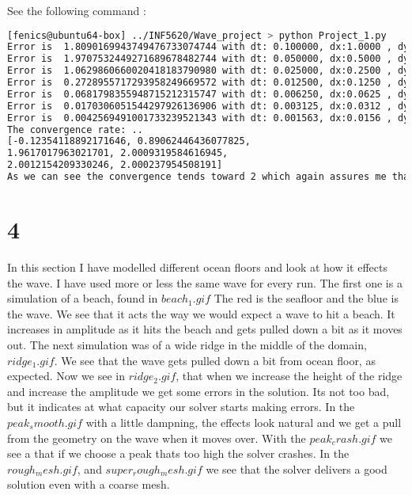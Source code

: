 \documentclass[a4paper,norsk]{article}
\begin{document}
\noindent See the following command :
\begin{lstlisting}[language=bash]
[fenics@ubuntu64-box] ../INF5620/Wave_project > python Project_1.py 
Error is  1.8090169943749476733074744 with dt: 0.100000, dx:1.0000 , dy:1.0000 
Error is  1.9707532449271689678482744 with dt: 0.050000, dx:0.5000 , dy:0.5000 
Error is  1.0629860660020418183790980 with dt: 0.025000, dx:0.2500 , dy:0.2500 
Error is  0.2728955717293958249669572 with dt: 0.012500, dx:0.1250 , dy:0.1250 
Error is  0.0681798355948715212315747 with dt: 0.006250, dx:0.0625 , dy:0.0625 
Error is  0.0170306051544297926136906 with dt: 0.003125, dx:0.0312 , dy:0.0312
Error is  0.0042569491001733239521343 with dt: 0.001563, dx:0.0156 , dy:0.0156 
The convergence rate: .. 
[-0.12354118892171646, 0.89062446436077825, 
1.9617017963021701, 2.0009319584616945, 
2.0012154209330246, 2.000237954508191]
As we can see the convergence tends toward 2 which again assures me that the solver is correct.

\end{lstlisting}



\section*{4}

In this section I have modelled different ocean floors and look at how it effects the wave. I have used more or less the same wave for every run.
The first one is a simulation of a beach, found in $beach_1.gif$  The red is the seafloor and the blue is the wave. We see that it acts the way we would expect a wave to hit a beach. It increases in amplitude as it hits the beach and gets pulled down a bit as it moves out.
The next simulation was of a wide ridge in the middle of the domain,$ ridge_1.gif$. We see that the wave gets pulled down a bit from ocean floor, as expected. Now we see in $ridge_2.gif$, that when we increase the height of the ridge and increase the amplitude we get some errors in the solution. Its not too bad, but it indicates at what capacity our solver starts making errors.
In the $peak_smooth.gif$ with a little dampning, the effects look natural and we get a pull from the geometry on the wave when it moves over.
With the $peak_crash.gif$ we see a that if we choose a peak thats too high the solver crashes.
In the $rough_mesh.gif$, and $super_rough_mesh.gif$ we see that the solver delivers a good solution even with a coarse mesh.
\end{document}

